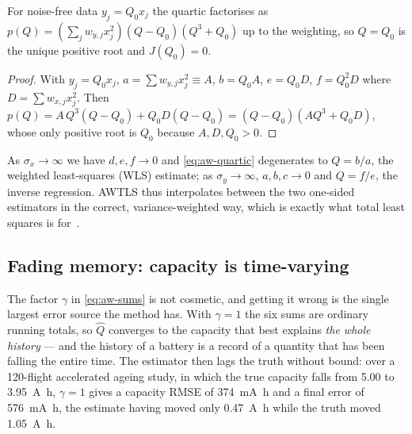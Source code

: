 \begin{proposition}[Consistency]\label{prop:aw-consist}
For noise-free data $y_j=Q_0x_j$ the quartic factorises as
$p(Q)=\left(\sum_j w_{y,j}x_j^2\right)\left(Q-Q_0\right)\left(Q^3+Q_0\right)$ up to the weighting,
so $Q=Q_0$ is the unique positive root and $J(Q_0)=0$.
\end{proposition}
\begin{proof}
With $y_j=Q_0x_j$, $a=\sum w_{y,j}x_j^2\equiv A$, $b=Q_0A$, $e=Q_0D$, $f=Q_0^2D$ where
$D=\sum w_{x,j}x_j^2$.  Then $p(Q)=A\,Q^3(Q-Q_0)+Q_0D(Q-Q_0)=(Q-Q_0)\left(AQ^3+Q_0D\right)$, whose
only positive root is $Q_0$ because $A,D,Q_0>0$.
\end{proof}

\begin{remark}
As $\sigma_x\to\infty$ we have $d,e,f\to0$ and \eqref{eq:aw-quartic} degenerates to $Q=b/a$, the
weighted least-squares (WLS) estimate; as $\sigma_y\to\infty$, $a,b,c\to0$ and $Q=f/e$, the inverse
regression.  AWTLS thus interpolates between the two one-sided estimators in the correct,
variance-weighted way, which is exactly what total least squares is for~\cite[§6.3]{golubvanloan2013}.
\end{remark}

\subsection{Fading memory: capacity is time-varying}
\label{sec:aw-fade}
The factor $\gamma$ in \eqref{eq:aw-sums} is not cosmetic, and getting it wrong is the single
largest error source the method has.  With $\gamma=1$ the six sums are ordinary running totals, so
$\hat Q$ converges to the capacity that best explains \emph{the whole history} --- and the history of
a battery is a record of a quantity that has been falling the entire time.  The estimator then lags
the truth without bound: over a 120-flight accelerated ageing study, in which the true capacity falls
from \SI{5.00}{} to \SI{3.95}{\ampere\hour}, $\gamma=1$ gives a capacity RMSE of
\SI{374}{\milli\ampere\hour} and a final error of \SI{+576}{\milli\ampere\hour}, the estimate having
moved only \SI{0.47}{\ampere\hour} while the truth moved \SI{1.05}{\ampere\hour}.

